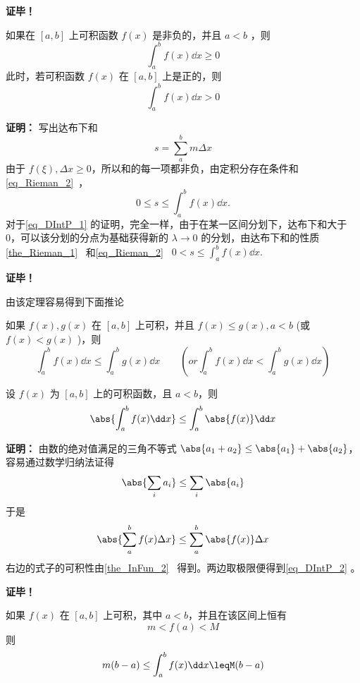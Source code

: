 \textbf{证毕！} 

\begin{theorem}{}
如果在 $[a,b]$ 上可积函数 $f(x)$ 是非负的，并且 $a<b$ ，则
\begin{equation}
\int_a^b f(x)\dd x\geq0
\end{equation}
此时，若可积函数 $f(x)$ 在 $[a,b]$ 上是正的，则
\begin{equation}\label{eq_DIntP_1}
\int_a^b f(x)\dd x>0
\end{equation}
\end{theorem}
\textbf{证明：}
写出达布下和
\begin{equation}
s=\sum_{a}^bm\Delta x
\end{equation}
由于 $f(\xi),\Delta x\geq0$，所以和的每一项都非负，由定积分存在条件和\autoref{eq_Rieman_2}~，
\begin{equation}
0\leq s\leq\int_a^b f(x)\dd x.
\end{equation}
对于\autoref{eq_DIntP_1} 的证明，完全一样，由于在某一区间分划下，达布下和大于0，可以该分划的分点为基础获得新的 $\lambda\rightarrow0$ 的分划，由达布下和的性质\autoref{the_Rieman_1}~ 和\autoref{eq_Rieman_2}~ 
$0<s\leq\int_a^b f(x)\dd x.$

\textbf{证毕！}

由该定理容易得到下面推论
\begin{corollary}{}
如果 $f(x),g(x)$ 在 $[a,b]$ 上可积，并且 $f(x)\leq g(x),a<b$ (或 $f(x)< g(x)$ )，则
\begin{equation}
\int_a^b f(x)\dd x\leq\int_a^b g(x)\dd x\qquad (or \int_a^b f(x)\dd x<\int_a^b g(x)\dd x)
\end{equation}

\end{corollary}
\begin{theorem}{}
设 $f(x)$ 为 $[a,b]$ 上的可积函数，且 $a<b$，则
\begin{equation}\label{eq_DIntP_2}
\abs{\int_a^b f(x)\dd x}\leq\int_a^b \abs{f(x)}\dd x
\end{equation}
\end{theorem}
\textbf{证明：}
由数的绝对值满足的三角不等式 $\abs{a_1+a_2}\leq\abs{a_1}+\abs{a_2}$，容易通过数学归纳法证得
\begin{equation}
\abs{\sum_i a_i}\leq\sum_i \abs{a_i}
\end{equation}
于是
\begin{equation}
\abs{\sum_a^b f(x)\Delta x}\leq\sum_a^b\abs{f(x)}\Delta x
\end{equation}
右边的式子的可积性由\autoref{the_InFun_2}~ 得到。两边取极限便得到\autoref{eq_DIntP_2} 。

\textbf{证毕！}

\begin{theorem}{}
如果 $f(x)$ 在 $[a,b]$ 上可积，其中 $a<b$，并且在该区间上恒有
\begin{equation}
m<f(a)<M
\end{equation}
则
\begin{equation}
m(b-a)\leq\int_a^b f(x)\dd x\leqM(b-a)
\end{equation}

\end{theorem}